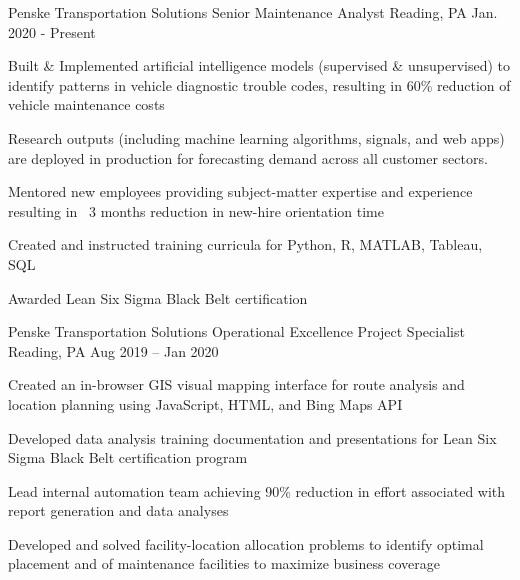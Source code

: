 


\begin{cventries}


\cventry
{Penske Transportation Solutions} %
{Senior Maintenance Analyst} %
{Reading, PA} %
{Jan. 2020 - Present} %
{ %
\begin{cvitems}
\item {Built \& Implemented artificial intelligence models (supervised \& unsupervised) to identify patterns in vehicle diagnostic trouble codes, resulting in 60\% reduction of vehicle maintenance costs}
\item {Research outputs (including machine learning algorithms, signals, and web apps) are deployed in production for forecasting demand across all customer sectors.}
\item {Mentored new employees providing subject-matter expertise and experience resulting in ~3 months reduction in new-hire orientation time}
\item {Created and instructed training curricula for Python, R, MATLAB, Tableau, SQL}
\item {Awarded Lean Six Sigma Black Belt certification}
\end{cvitems}
}


\cventry
{Penske Transportation Solutions} %
{Operational Excellence Project Specialist} %
{Reading, PA} %
{Aug 2019 – Jan 2020} %
{ %
\begin{cvitems}
\item {Created an in-browser GIS visual mapping interface for route analysis and location planning using JavaScript, HTML, and Bing Maps API}
\item {Developed data analysis training documentation and presentations for Lean Six Sigma Black Belt certification program}
\item {Lead internal automation team achieving 90\% reduction in effort associated with report generation and data analyses}
\item {Developed and solved facility-location allocation problems to identify optimal placement and  of maintenance facilities to maximize business coverage}
\end{cvitems}
}


\end{cventries}
